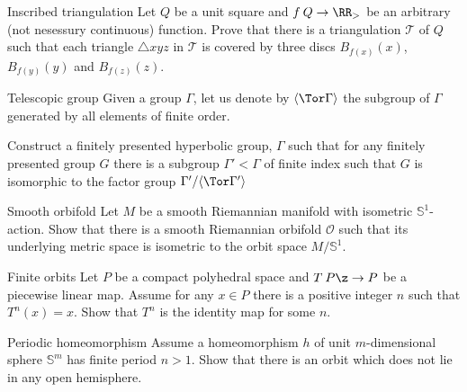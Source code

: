 \begin{pr}{}{Inscribed triangulation}
Let $Q$ be a unit square and $f\:Q\to\RR_>$ be an arbitrary (not nesessury continuous) function.
Prove that there is a triangulation $\mathcal T$ of $Q$ such that each triangle $\triangle xyz$ in $\mathcal T$ is covered by three discs $B_{f(x)}(x)$, $B_{f(y)}(y)$ and $B_{f(z)}(z)$.
\end{pr}




\begin{pr}{}{Telescopic group}
Given a group $\Gamma$, let us denote by $\langle\Tor\Gamma\rangle$ the subgroup of $\Gamma$ generated by all elements of finite order.

Construct a finitely presented hyperbolic group, $\Gamma$ such that for any finitely presented group $G$ there is a subgroup $\Gamma'<\Gamma$ of finite index such that 
$G$ is isomorphic to the factor group $\Gamma'/\langle\Tor\Gamma'\rangle$
\end{pr}



\begin{pr}{}{Smooth orbifold}\label{Smooth orbifold}
Let $M$ be a smooth Riemannian manifold with isometric 
$\mathbb{S}^1$-action.
Show that there is a smooth Riemannian orbifold $\mathcal{O}$
such that its underlying metric space 
is isometric to the orbit space $M/\mathbb{S}^1$.
\end{pr}


\begin{pr}{}{Finite orbits}\label{Finite orbits}
Let $P$ be a compact polyhedral space and $T\:P\z\to P$ be a piecewise linear map.
Assume for any $x\in P$ there is a positive integer $n$ such that
$T^n(x)=x$.
Show that $T^n$ is the identity map for some $n$. 
\end{pr}

\begin{pr}{\easy}{Periodic homeomorphism}\label{Finite action}
Assume a homeomorphism $h$ of unit $m$-dimensional sphere $\mathbb S^m$ has  finite period $n>1$.
Show that there is an orbit which does not lie in any open hemisphere.
\end{pr}
